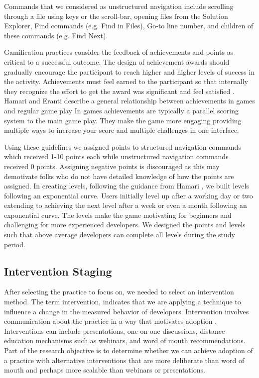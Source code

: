 \documentclass{sig-alternate}
\begin{document}
Commands that we considered as unstructured navigation include scrolling through a file using keys or the scroll-bar, opening files from the Solution Explorer, Find commands (e.g. Find in Files), Go-to line number, and children of these commands (e.g. Find Next).

Gamification practices consider the feedback of achievements and points as critical to a successful outcome.  The design of achievement awards should gradually encourage the participant to reach higher and higher levels of success in the activity.  Achievements must feel earned to the participant so that internally they recognize the effort to get the award was significant and feel satisfied  \cite{wbsnipes:Hamari2011Framework}.  Hamari and Eranti describe a general relationship between achievements in games and regular game play      In games achievements are typically a parallel scoring system to the main game play.  They make the game more engaging providing multiple ways to increase your score and multiple challenges in one interface.

Using these guidelines we assigned points to structured navigation commands which received 1-10 points each while unstructured navigation commands received 0 points.  Assigning negative points is discouraged as this may demotivate folks who do not have detailed knowledge of how the points are assigned.\cite{}   In creating levels, following the guidance from Hamari \cite{wbsnipes:Hamari2011Framework}, we built levels following an exponential curve.  Users initially level up after a working day or two extending to achieving the next level after a week or even a month following an exponential curve.  The levels make the game motivating for beginners and challenging for more experienced developers.  We designed the points and levels such that above average developers can complete all levels during the study period.

\subsection{Intervention Staging}

After selecting the practice to focus on, we needed to select an intervention method.  The term intervention, indicates that we are applying a technique to influence a change in the measured behavior of developers.  Intervention involves communication about the practice in a way that motivates adoption \cite{}.  Interventions can include presentations, one-on-one discussions, distance education mechanisms such as webinars, and word of mouth recommendations.  Part of the research objective is to determine whether we can achieve adoption of a practice with alternative interventions that are more deliberate than word of mouth and perhaps more scalable than webinars or presentations.  
\end{document}
